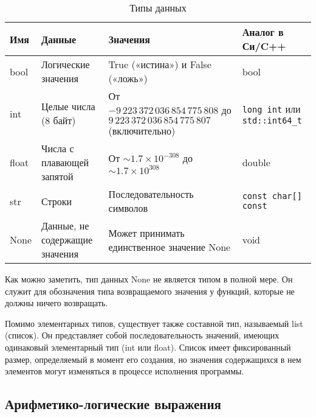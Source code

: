\begin{table}[h]
    \centering
    \caption{Типы данных}
    \label{tab:data_types}
    \begin{tabular}{lp{3cm}p{7cm}p{3cm}}
        \toprule
        \textbf{Имя} & \textbf{Данные}                & \textbf{Значения}                                                                         & \textbf{Аналог в Си/C++}                     \\
        \midrule
        bool         & Логические значения            & True («истина») и False («ложь»)                                                          & bool                                         \\
        \addlinespace
        int          & Целые числа (8 байт)           & От $-9\,223\,372\,036\,854\,775\,808$ до $9\,223\,372\,036\,854\,775\,807$ (включительно) & \texttt{long int} или \texttt{std::int64\_t} \\
        \addlinespace
        float        & Числа с плавающей запятой      & От $\sim 1.7 \times 10^{-308}$ до $\sim 1.7 \times 10^{308}$                              & double                                       \\
        \addlinespace
        str          & Строки                         & Последовательность символов                                                               & \texttt{const char[] const}                  \\
        \addlinespace
        None         & Данные, не содержащие значения & Может принимать единственное значение None                                                & void                                         \\
        \bottomrule
    \end{tabular}
\end{table}

Как можно заметить, тип данных None не является типом в полной мере.
Он служит для обозначения типа возвращаемого значения у функций, которые не должны ничего возвращать.

Помимо элементарных типов, существует также составной тип, называемый list (список).
Он представляет собой последовательность значений, имеющих одинаковый элементарный тип (int или float).
Список имеет фиксированный размер, определяемый в момент его создания, но значения содержащихся в нем элементов могут изменяться в процессе исполнения программы.

\subsection{Арифметико-логические выражения}

